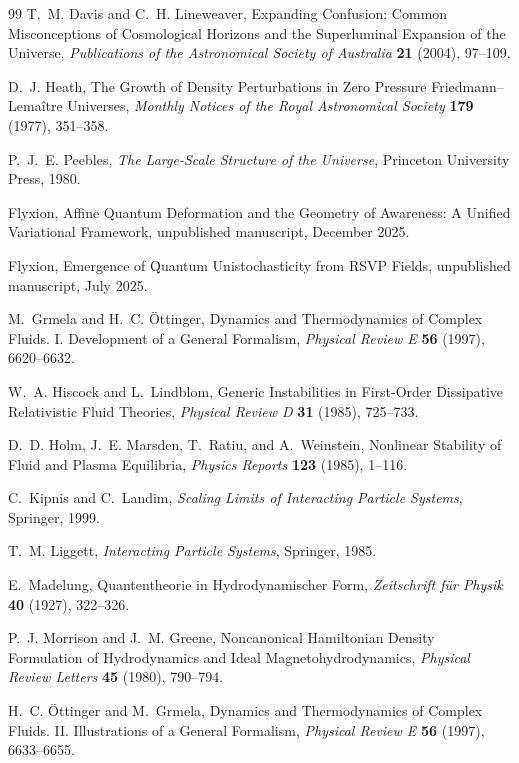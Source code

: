 \documentclass[11pt,oneside]{book}
\theoremstyle{definition}
\theoremstyle{remark}
\begin{document}
\begin{thebibliography}{99}
T.~M. Davis and C.~H. Lineweaver,
Expanding Confusion: Common Misconceptions of Cosmological Horizons and the Superluminal Expansion of the Universe,
\emph{Publications of the Astronomical Society of Australia} \textbf{21} (2004), 97--109.

D.~J. Heath,
The Growth of Density Perturbations in Zero Pressure Friedmann--Lema\^itre Universes,
\emph{Monthly Notices of the Royal Astronomical Society} \textbf{179} (1977), 351--358.

P.~J.~E. Peebles,
\emph{The Large-Scale Structure of the Universe},
Princeton University Press, 1980.

Flyxion,
Affine Quantum Deformation and the Geometry of Awareness: A Unified Variational Framework,
unpublished manuscript, December 2025.

Flyxion,
Emergence of Quantum Unistochasticity from RSVP Fields,
unpublished manuscript, July 2025.

M.~Grmela and H.~C. \"Ottinger,
Dynamics and Thermodynamics of Complex Fluids. I. Development of a General Formalism,
\emph{Physical Review E} \textbf{56} (1997), 6620--6632.

W.~A. Hiscock and L.~Lindblom,
Generic Instabilities in First-Order Dissipative Relativistic Fluid Theories,
\emph{Physical Review D} \textbf{31} (1985), 725--733.

D.~D. Holm, J.~E. Marsden, T.~Ratiu, and A.~Weinstein,
Nonlinear Stability of Fluid and Plasma Equilibria,
\emph{Physics Reports} \textbf{123} (1985), 1--116.

C.~Kipnis and C.~Landim,
\emph{Scaling Limits of Interacting Particle Systems},
Springer, 1999.

T.~M. Liggett,
\emph{Interacting Particle Systems},
Springer, 1985.

E.~Madelung,
Quantentheorie in Hydrodynamischer Form,
\emph{Zeitschrift f\"ur Physik} \textbf{40} (1927), 322--326.

P.~J. Morrison and J.~M. Greene,
Noncanonical Hamiltonian Density Formulation of Hydrodynamics and Ideal Magnetohydrodynamics,
\emph{Physical Review Letters} \textbf{45} (1980), 790--794.

H.~C. \"Ottinger and M.~Grmela,
Dynamics and Thermodynamics of Complex Fluids. II. Illustrations of a General Formalism,
\emph{Physical Review E} \textbf{56} (1997), 6633--6655.


\end{thebibliography}
\end{document}
